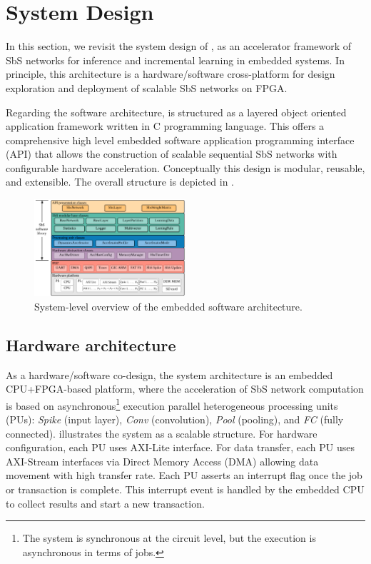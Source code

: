 \section{System Design}
\label{sec:system_design}
In this section, we revisit the system design of \cite{nevarez2020accelerator}, as an accelerator framework of SbS networks for inference and incremental learning in embedded systems. In principle, this architecture is a hardware/software cross-platform for design exploration and deployment of scalable SbS networks on FPGA.

Regarding the software architecture,  is structured as a layered object oriented application framework written in C programming language. This offers a comprehensive high level embedded software application programming interface (API) that allows the construction of scalable sequential SbS networks with configurable hardware acceleration. Conceptually this design is modular, reusable, and extensible. The overall structure is depicted in .

\begin{figure}[t!]
	\centering
	\includegraphics[width=0.5\textwidth]{../figures/sbs_software_component.pdf}
	\caption{System-level overview of the embedded software architecture.}
	\label{fig:sw_stack}
\end{figure}

\subsection{Hardware architecture} \label{Hardware_architecture}
As a hardware/software co-design, the system architecture is an embedded CPU+FPGA-based platform, where the acceleration of SbS network computation is based on asynchronous\footnote{The system is synchronous at the circuit level, but the execution is asynchronous in terms of jobs.} execution  parallel heterogeneous processing units (PUs): \emph{Spike} (input layer), \emph{Conv} (convolution), \emph{Pool} (pooling), and \emph{FC} (fully connected).  illustrates the system  as a scalable structure. For hardware configuration, each PU uses AXI-Lite interface. For data transfer, each PU uses AXI-Stream interfaces via Direct Memory Access (DMA) allowing data movement with high transfer rate. Each PU asserts an interrupt flag once the job or transaction is complete. This interrupt event is handled by the embedded CPU to collect results and start a new transaction.

